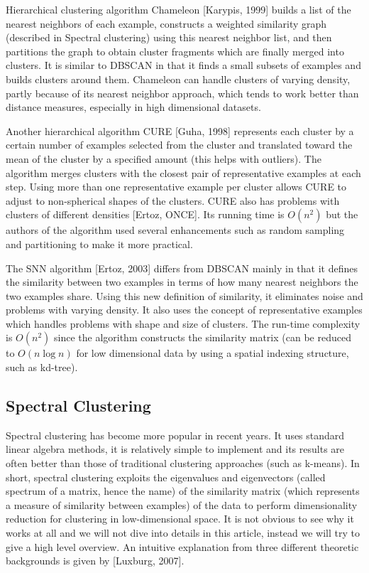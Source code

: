 \documentclass[conference]{IEEEtran}
\begin{document}
Hierarchical clustering algorithm Chameleon [Karypis, 1999] builds a list of the nearest
neighbors of each example, constructs a weighted similarity graph (described in Spectral clustering)
using this nearest neighbor list, and then partitions the graph to obtain cluster fragments
which are finally merged into clusters. It is similar to DBSCAN in that it finds a small subsets
of examples and builds clusters around them. Chameleon can handle clusters of varying density,
partly because of its nearest neighbor approach, which tends to work better than distance measures,
especially in high dimensional datasets.

Another hierarchical algorithm CURE [Guha, 1998] represents each cluster by a certain
number of examples selected from the cluster and translated toward the mean of the cluster
by a specified amount (this helps with outliers). The algorithm merges clusters with
the closest pair of representative examples at each step. Using more than one representative
example per cluster allows CURE to adjust to non-spherical shapes of the clusters.
CURE also has problems with clusters of different densities [Ertoz, ONCE]. Its running
time is $O(n^2)$ but the authors of the algorithm used several enhancements such as
random sampling and partitioning to make it more practical.

The SNN algorithm [Ertoz, 2003] differs from DBSCAN mainly in that it defines the similarity
between two examples in terms of how many nearest neighbors the two examples share.
Using this new definition of similarity, it eliminates noise and problems with varying density.
It also uses the concept of representative examples which handles problems with shape
and size of clusters. The run-time complexity is $O(n^2)$ since the algorithm constructs
the similarity matrix (can be reduced to $O(n \log n)$ for low dimensional data by using a spatial
indexing structure, such as kd-tree).


\subsection{Spectral Clustering}
Spectral clustering has become more popular in recent years. It uses standard linear algebra
methods, it is relatively simple to implement and its results are often better than those of
traditional clustering approaches (such as k-means). In short, spectral clustering exploits the
eigenvalues and eigenvectors (called spectrum of a matrix, hence the name) of the similarity matrix
(which represents
a measure of similarity between examples) of the data to perform dimensionality reduction for
clustering in low-dimensional space. It is not obvious to see why it works at all
and we will not dive into details in this article, instead we will try to give a high level overview.
An intuitive explanation from three different theoretic backgrounds is given by [Luxburg, 2007].
\end{document}
